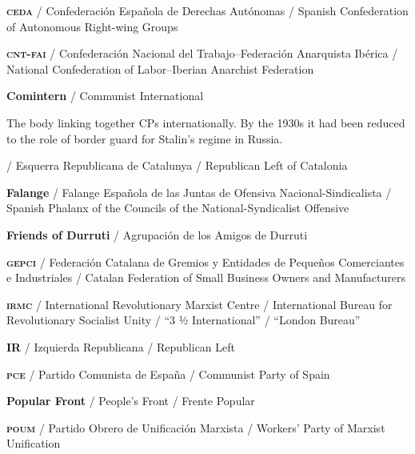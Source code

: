 \begin{multicols}{2}
  \RaggedRight
  \setlength{\parskip}{0.25\baselineskip}
	
  \textbf{\textsc{ceda}} / Confederación Española de Derechas Autónomas / Spanish Confederation of Autonomous Right-wing Groups
  
  \bigskip

  \textbf{\textsc{cnt-fai}} / Confederación Nacional del Trabajo–Federación Anarquista Ibérica / National Confederation of Labor–Iberian Anarchist Federation

  \bigskip

  \textbf{Comintern} / Communist International

  The body linking together CPs internationally. By the 1930s it had been reduced to the role of border guard for Stalin’s regime in Russia.
  
  \bigskip

  \textbf{\ERC} / Esquerra Republicana de Catalunya / Republican Left of Catalonia
  
  \bigskip

  \textbf{Falange} / Falange Española de las Juntas de Ofensiva Nacional-Sindicalista / Spanish Phalanx of the Councils of the National-Syndicalist Offensive
  
  \bigskip

  \textbf{Friends of Durruti} / Agrupación de los Amigos de Durruti
  
  \bigskip

  \textbf{\textsc{gepci}} / Federación Catalana de Gremios y Entidades de Pequeños Comerciantes e Industriales / Catalan Federation of Small Business Owners and Manufacturers
  
  \bigskip

  \textbf{\textsc{irmc}} / International Revolutionary Marxist Centre / International Bureau for Revolutionary Socialist Unity / “3 ½ International” / “London Bureau”
  
  \bigskip

  \textbf{IR} / Izquierda Republicana / Republican Left

  \bigskip

  \textbf{\textsc{pce}} / Partido Comunista de España / Communist Party of Spain
  
  \bigskip
  
  \textbf{Popular Front} / People’s Front / Frente Popular
  \bigskip

  \textbf{\textsc{poum}} / Partido Obrero de Unificación Marxista / Workers’ Party of Marxist Unification


\end{multicols}
